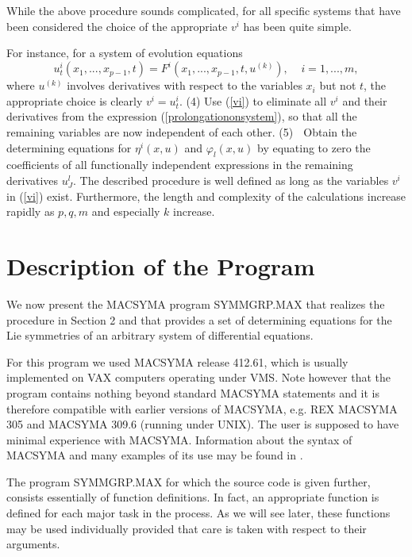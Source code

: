 {\nopagebreak
While the above procedure sounds complicated,
for all specific systems that 
have been considered the choice of the appropriate $v^i$ has been quite simple.

\pagebreak
\noindent
For instance, for a system of evolution equations
\begin{equation}
u^{i}_{t} (x_1 , ... , x_{p-1} , t ) = F^{i} (x_1 , ... , x_{p-1}, t,u^{(k)}),
\;\;\;\; i = 1, ... , m,
\label{evoleqs}
\end{equation}
where $u^{(k)}$ involves derivatives with respect to the variables $x_i$ 
but not $t$, the appropriate choice is clearly $ v^i = u_{t}^{i} .$
\nopagebreak
\vskip 2pt
\noindent
(4) Use (\ref{vi}) 
to eliminate all $v^i$ and their derivatives from the expression
(\ref{prolongationonsystem}), so that all the remaining variables 
are now independent of each other.
\nopagebreak
\vskip 2pt
\noindent
(5) $\;$ Obtain the determining equations 
for $ \eta^{i} (x , u ) $ and $ \varphi_l (x , u) $ 
by equating to zero the coefficients
of all functionally independent expressions in the remaining derivatives
$u_{J}^{l}$.
\vskip 2pt
The described procedure is well defined as long as the variables $v^i$ 
in (\ref{vi}) exist.
Furthermore, the length and complexity of the calculations increase rapidly
as $p, q, m $ and especially $k$ increase.

\nopagebreak
\section{Description of the Program}
We now present the MACSYMA program SYMMGRP.MAX that realizes the procedure in 
Section 2 and that
provides a set of determining equations for the Lie symmetries
of an arbitrary system of differential equations. 

\nopagebreak
For this program we used MACSYMA release 412.61, which is usually implemented 
on VAX computers operating under VMS.
Note however that the program contains nothing beyond standard MACSYMA
statements and it is therefore compatible with earlier versions of 
MACSYMA, e.g. REX MACSYMA 305 and MACSYMA 309.6 (running under UNIX).
The user is supposed to have minimal experience with MACSYMA.
Information about the syntax of MACSYMA and many examples of its use
may be found in \cite{macsymamanual,macsymausersguide}. 

\nopagebreak
The program SYMMGRP.MAX for which the source code is given further,
consists essentially of function definitions. 
In fact, an appropriate function is defined for each major
task in the process. As we will see later, these
functions may be used individually provided that care is taken with respect
to their arguments. 

}
